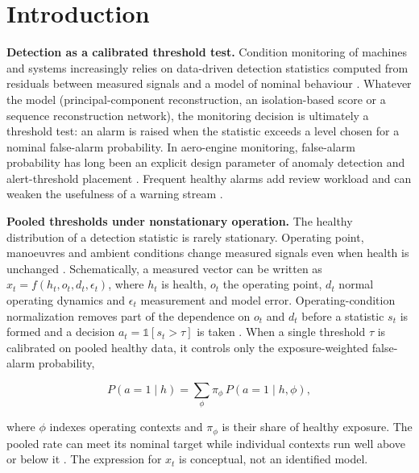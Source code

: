 \documentclass[preprint,11pt,a4paper]{elsarticle}
\begin{document}
\section{Introduction}

\textbf{Detection as a calibrated threshold test.} Condition monitoring of machines and systems increasingly relies on data-driven detection statistics computed from residuals between measured signals and a model of nominal behaviour \cite{N1}. Whatever the model (principal-component reconstruction, an isolation-based score or a sequence reconstruction network), the monitoring decision is ultimately a threshold test: an alarm is raised when the statistic exceeds a level chosen for a nominal false-alarm probability. In aero-engine monitoring, false-alarm probability has long been an explicit design parameter of anomaly detection and alert-threshold placement \cite{ref2,ref11}. Frequent healthy alarms add review workload and can weaken the usefulness of a warning stream \cite{ref12}.

\textbf{Pooled thresholds under nonstationary operation.} The healthy distribution of a detection statistic is rarely stationary. Operating point, manoeuvres and ambient conditions change measured signals even when health is unchanged \cite{N2,N3,N4}. Schematically, a measured vector can be written as $x_t = f(h_t, o_t, d_t, \epsilon_t)$, where $h_t$ is health, $o_t$ the operating point, $d_t$ normal operating dynamics and $\epsilon_t$ measurement and model error. Operating-condition normalization removes part of the dependence on $o_t$ and $d_t$ before a statistic $s_t$ is formed and a decision $a_t = \mathbb{1}[s_t > \tau]$ is taken \cite{N2,N4,N5,N6}. When a single threshold $\tau$ is calibrated on pooled healthy data, it controls only the exposure-weighted false-alarm probability,

\[P(a=1\mid h) = \sum_{\phi} \pi_\phi \, P(a=1 \mid h,\phi),\]

where $\phi$ indexes operating contexts and $\pi_\phi$ is their share of healthy exposure. The pooled rate can meet its nominal target while individual contexts run well above or below it \cite{N7}. The expression for $x_t$ is conceptual, not an identified model.
\end{document}
